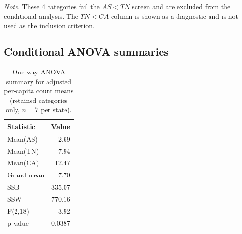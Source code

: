 \begin{table}[H]
  \centering
  \caption{Categories failing conditional screen ($AS \geq TN$).}
  \label{tab:conditional-screen-excluded}
  \small
\end{table}

\noindent\textit{Note.} These 4 categories fail the $AS<TN$ screen and are excluded from the conditional analysis. The $TN<CA$ column is shown as a diagnostic and is not used as the inclusion criterion.

\subsection{Conditional ANOVA summaries}

\begin{table}[H]
  \centering
  \caption{One-way ANOVA summary for adjusted per-capita count means (retained categories only, $n=7$ per state).}
  \label{tab:conditional-count-summary}
  \begin{tabular}{@{}lr@{}}
    \toprule
    Statistic & Value\\
    \midrule
    Mean(AS) & 2.69\\
    Mean(TN) & 7.94\\
    Mean(CA) & 12.47\\
    Grand mean & 7.70\\
    SSB & 335.07\\
    SSW & 770.16\\
    F(2,18) & 3.92\\
    p-value & 0.0387\\
    \bottomrule
  \end{tabular}
\end{table}

